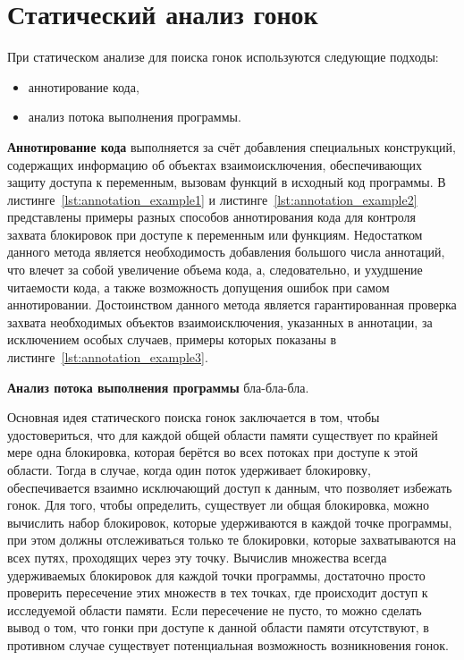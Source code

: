 \chapter{Статический анализ гонок}
\label{cha:static-methods}

При статическом анализе для поиска гонок используются следующие подходы:
\begin{itemize}
\item аннотирование кода,
\item анализ потока выполнения программы.
\end{itemize}

\textbf{Аннотирование кода} выполняется за счёт добавления специальных конструкций, содержащих информацию об объектах взаимоисключения, обеспечивающих защиту доступа к переменным, вызовам функций в исходный код программы. В листинге~\ref{lst:annotation_example1} и листинге~\ref{lst:annotation_example2} представлены примеры разных способов аннотирования кода для контроля захвата блокировок при доступе к переменным или функциям. Недостатком данного метода является необходимость добавления большого числа аннотаций, что влечет за собой увеличение объема кода, а, следовательно, и ухудшение читаемости кода, а также возможность допущения ошибок при самом аннотировании. Достоинством данного метода является гарантированная проверка захвата необходимых объектов взаимоисключения, указанных в аннотации, за исключением особых случаев, примеры которых показаны в листинге~\ref{lst:annotation_example3}.







\textbf{Анализ потока выполнения программы} бла-бла-бла.

Основная идея статического поиска гонок заключается в том, чтобы удостовериться, что для каждой общей области памяти существует по крайней мере одна блокировка, которая берётся во всех потоках при доступе к этой области. Тогда в случае, когда один поток удерживает блокировку, обеспечивается взаимно исключающий доступ к данным, что позволяет избежать гонок. Для того, чтобы определить, существует ли общая блокировка, можно вычислить набор блокировок, которые удерживаются в каждой точке программы, при этом должны отслеживаться только те блокировки, которые захватываются на всех путях, проходящих через эту точку. Вычислив множества всегда удерживаемых блокировок для каждой точки программы, достаточно просто проверить пересечение этих множеств в тех точках, где происходит доступ к исследуемой области памяти. Если пересечение не пусто, то можно сделать вывод о том, что гонки при доступе к данной области памяти отсутствуют, в противном случае существует потенциальная возможность возникновения гонок.

